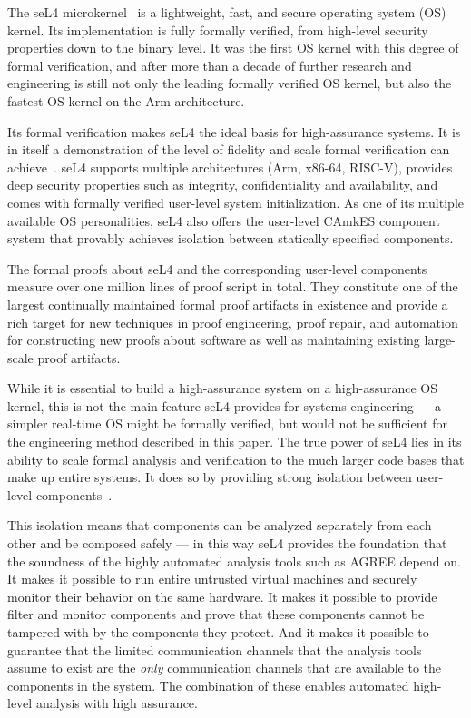 
The seL4 microkernel~\cite{sel4-sosp09} is a lightweight, fast, and secure
operating system (OS) kernel. Its implementation is fully formally verified,
from high-level security properties down to the binary level. It was the first
OS kernel with this degree of formal verification, and after more than a decade
of further research and engineering is still not only the leading formally
verified OS kernel, but also the fastest OS kernel on the Arm architecture.

Its formal verification makes seL4 the ideal basis for high-assurance systems.
It is in itself a demonstration of the level of fidelity and scale formal
verification can achieve~\cite{sel4-tocs14}. seL4 supports multiple architectures
(Arm, x86-64, RISC-V), provides deep security properties such as integrity,
confidentiality and availability, and comes with formally verified user-level
system initialization. As one of its multiple available OS personalities, seL4 
also offers the user-level CAmkES component system that provably achieves isolation
between statically specified components.

The formal proofs about seL4 and the corresponding user-level components measure
over one million lines of proof script in total. They constitute one of the
largest continually maintained formal proof artifacts in existence and provide a
rich target for new techniques in proof engineering, proof repair, and
automation for constructing new proofs about software as well as maintaining
existing large-scale proof artifacts.

While it is essential to build a high-assurance system on a high-assurance OS
kernel, this is not the main feature seL4 provides for systems engineering --- a
simpler real-time OS might be formally verified, but would not be sufficient for the
engineering method described in this paper. The true power of seL4 lies in its
ability to scale formal analysis and verification to the much larger code bases
that make up entire systems. It does so by providing strong isolation between
user-level components~\cite{sel4-cacm18}.

This isolation means that components can be analyzed separately from each other
and be composed safely --- in this way seL4 provides the foundation that the soundness of the highly
automated analysis tools such as AGREE depend on. It makes it possible to run
entire untrusted virtual machines and securely monitor their behavior on the
same hardware. It makes it possible to provide filter and monitor components and
prove that these components cannot be tampered with by the components they protect.
And it makes it possible to guarantee that the limited communication channels that the analysis tools
assume to exist are the \emph{only} communication channels that are available to the
components in the system. The combination of these enables automated
high-level analysis with high assurance.
